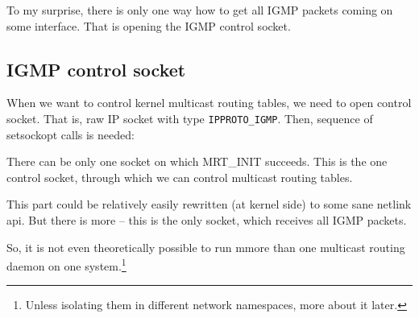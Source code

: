 To my surprise, there is only one way how to get all IGMP packets coming on
some interface. That is opening the IGMP control socket.

\subsection{IGMP control socket}

When we want to control kernel multicast routing tables, we need to open
control socket. That is, raw IP socket with type \texttt{IPPROTO\_IGMP}. Then,
sequence of setsockopt calls is needed:


There can be only one socket on which MRT\_INIT succeeds. This is the one
control socket, through which we can control multicast routing tables.

This part could be relatively easily rewritten (at kernel side) to some sane
netlink api. But there is more -- this is the only socket, which receives all
IGMP packets.

So, it is not even theoretically possible to run mmore than one multicast
routing daemon on one system.\footnote{Unless isolating them in different
network namespaces, more about it later.}
